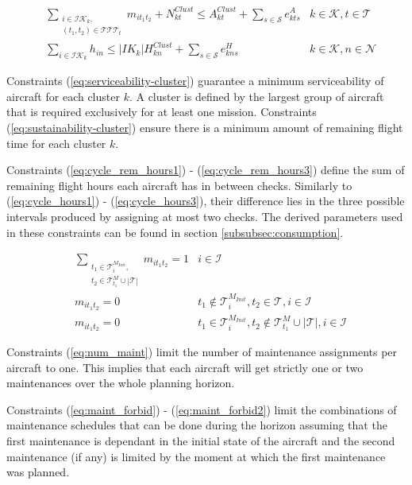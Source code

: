\documentclass[a4paper,onecolumn,fleqn]{article}
\begin{document}
    \begin{align}
       & \sum_{\substack{i \in \mathcal{IK}_k, \\ (t_1, t_2) \in \mathcal{T}\mathcal{T}\mathcal{T}_{t}}} m_{it_1t_2} + N^{Clust}_{kt} \leq A^{Clust}_{kt} + \sum_{s \in \mathcal{S}} e^{A}_{kts}
        &k \in \mathcal{K}, t \in \mathcal{T} \label{eq:serviceability-cluster}\\
       & \sum_{i \in \mathcal{IK}_k} h_{in} \leq |{IK}_k| H^{Clust}_{kn} + \sum_{s \in \mathcal{S}} e^{H}_{kns}
        &k \in \mathcal{K}, n \in \mathcal{N} \label{eq:sustainability-cluster}
    \end{align}

    Constraints (\ref{eq:serviceability-cluster}) guarantee a minimum serviceability of aircraft for each cluster $k$. A cluster is defined by the largest group of aircraft that is required exclusively for at least one mission. 
    Constraints (\ref{eq:sustainability-cluster}) ensure there is a minimum amount of remaining flight time for each cluster $k$.

    Constraints (\ref{eq:cycle_rem_hours1}) - (\ref{eq:cycle_rem_hours3}) define the sum of remaining flight hours each aircraft has in between checks. Similarly to (\ref{eq:cycle_hours1}) - (\ref{eq:cycle_hours3}), their difference lies in the three possible intervals produced by assigning at most two checks. The derived parameters used in these constraints can be found in section \ref{subsubsec:consumption}.

    \begin{align}
        & \sum_{\substack{t_1 \in \mathcal{T}^{M_{Init}}_i, \\ t_2 \in \mathcal{T}^M_{t_1} \cup |\mathcal{T}|}} m_{it_1t_2} =  1 
          & i \in \mathcal{I}\label{eq:num_maint} \\
        & m_{it_1t_2} =  0
          & t_1 \notin \mathcal{T}^{M_{Init}}_i, t_2 \in \mathcal{T}, i \in \mathcal{I} \label{eq:maint_forbid} \\
        & m_{it_1t_2} =  0
          & t_1 \in \mathcal{T}^{M_{Init}}_i, t_2 \notin \mathcal{T}^M_{t_1} \cup |\mathcal{T}|, i \in \mathcal{I} \label{eq:maint_forbid2}
    \end{align}

    Constraints (\ref{eq:num_maint}) limit the number of maintenance assignments per aircraft to one. This implies that each aircraft will get strictly one or two maintenances over the whole planning horizon.

    Constraints (\ref{eq:maint_forbid}) - (\ref{eq:maint_forbid2}) limit the combinations of maintenance schedules that can be done during the horizon assuming that the first maintenance is dependant in the initial state of the aircraft and the second maintenance (if any) is limited by the moment at which the first maintenance was planned.
\end{document}

